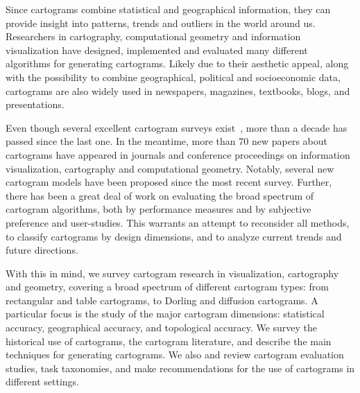 \documentclass{egpubl}
\begin{document}
Since cartograms combine statistical and geographical information, they can provide insight into patterns, trends and outliers in the world around us. Researchers in cartography, computational geometry and information visualization have designed, implemented and evaluated many different algorithms for generating cartograms.
Likely due to their aesthetic appeal, along with the possibility to combine geographical, political and socioeconomic data, cartograms are also widely used in newspapers, magazines, textbooks, blogs, and presentations. 




\begin{comment}
\begin{figure}[htbp]
\begin{center}
\texttt{[image: NYT\_2004\_map.png]}\\
(a)\\
\texttt{[image: NYT\_2004\_cartogram.png]}\\
(b)\\
\caption{Red-blue (Republican-Democrat) map of the USA showing 2004 election results from the New York Times~\cite{NYT_04}: (a) geographically accurate map,
 (b) a population cartogram.}
\vspace{-0.2cm}
\label{fig:red-blue}
\end{center}
\end{figure}
\end{comment}



Even though several excellent cartogram surveys exist~\cite{guseyn1994numerical,kocmoud1997constructing,Tobler04}, more than a decade has passed since the last one. In the meantime, more than 70 new papers about cartograms have appeared in journals and conference proceedings on information visualization, cartography and computational geometry. Notably, several new cartogram models have been proposed since the most recent survey. 
Further, there has been a great deal of work on evaluating the broad spectrum of cartogram algorithms, both by performance measures and by subjective preference and user-studies. This warrants an attempt to reconsider all methods, to classify cartograms by design dimensions, and to analyze current trends and future directions.


  With this in mind, we survey cartogram research in visualization, cartography and geometry, covering a broad spectrum of different cartogram types: from rectangular and table cartograms, to Dorling and diffusion cartograms. A particular focus is the study of the major cartogram dimensions: statistical accuracy, geographical accuracy, and topological accuracy. We survey the historical use of cartograms, the cartogram literature, and describe the main techniques for generating cartograms. We also and review cartogram evaluation studies, task taxonomies, and make recommendations for the use of cartograms in different settings.
\end{document}
